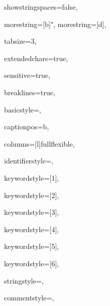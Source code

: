 {%
showstringspaces=false,

morestring=[b]",
morestring=[d],

tabsize=3,							

extendedchars=true,  		 		

sensitive=true, 

breaklines=true,

basicstyle=\ttfamily\color{dkgrey},

captionpos=b,							

columns=[l]fullflexible,

identifierstyle={\ttfamily\color{dkgrey}},

keywordstyle=[1]{\ttfamily\color{dkgrey}},

keywordstyle=[2]{\ttfamily\color{dkgrey}},

keywordstyle=[3]{\ttfamily\color{dkgrey}},

keywordstyle=[4]{\ttfamily\color{dkgrey}},

keywordstyle=[5]{\ttfamily\color{dkgrey}},


keywordstyle=[6]{\ttfamily\color{dkgrey}},

stringstyle=\ttfamily\color{dkgrey},

commentstyle=\ttfamily\color{dkgrey},

}


